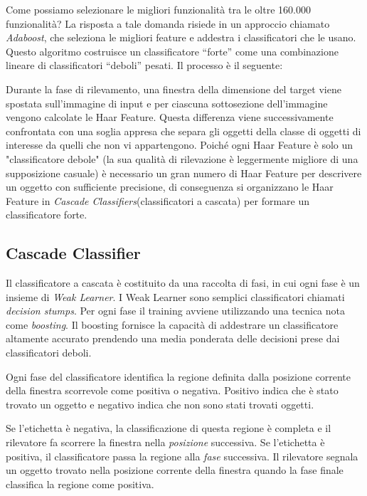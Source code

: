 Come possiamo selezionare le migliori funzionalità tra le oltre 160.000 funzionalità? La risposta a tale domanda risiede in un approccio chiamato \emph{Adaboost}, che seleziona le migliori feature e addestra i classificatori che le usano. Questo algoritmo costruisce un classificatore “forte” come una combinazione lineare di classificatori “deboli” pesati. Il processo è il seguente:

Durante la fase di rilevamento, una finestra della dimensione del target viene spostata sull'immagine di input e per ciascuna sottosezione dell'immagine vengono calcolate le Haar Feature.
Questa differenza viene successivamente confrontata con una soglia appresa che separa gli oggetti della classe di oggetti di interesse da quelli che non vi appartengono. Poiché ogni Haar Feature è solo un "classificatore debole" (la sua qualità di rilevazione è leggermente migliore di una supposizione casuale) è necessario un gran numero di Haar Feature per descrivere un oggetto con sufficiente precisione, di conseguenza si organizzano le Haar Feature in \emph{Cascade Classifiers}(classificatori a cascata) per formare un classificatore forte.

\subsection{Cascade Classifier}

Il classificatore a cascata è costituito da una raccolta di fasi, in cui ogni fase è un insieme di \emph{Weak Learner}. I Weak Learner sono semplici classificatori chiamati \emph{decision stumps}. Per ogni fase il training avviene utilizzando una tecnica nota come \emph{boosting}. Il boosting fornisce la capacità di addestrare un classificatore altamente accurato prendendo una media ponderata delle decisioni prese dai classificatori deboli.

Ogni fase del classificatore identifica la regione definita dalla posizione corrente della finestra scorrevole come positiva o negativa. Positivo indica che è stato trovato un oggetto e negativo indica che non sono stati trovati oggetti. 

Se l'etichetta è negativa, la classificazione di questa regione è completa e il rilevatore fa scorrere la finestra nella \emph{posizione} successiva. Se l'etichetta è positiva, il classificatore passa la regione alla \emph{fase} successiva. Il rilevatore segnala un oggetto trovato nella posizione corrente della finestra quando la fase finale classifica la regione come positiva.

